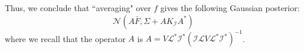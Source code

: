 Thus, we conclude that ``averaging" over $f$ gives the following Gaussian posterior:
\begin{equation}
    \label{posteriorDist}
    \mathcal{N}\left(A\bar{F},\Sigma+AK_{\mathcal{I}}A^{*}\right)
\end{equation}
where we recall that the operator $A$ is $A= V\mathcal{L}^{*}\mathcal{I}^{*}(\mathcal{I}\mathcal{L}V\mathcal{L}^{*}\mathcal{I}^{*})^{-1}$.
